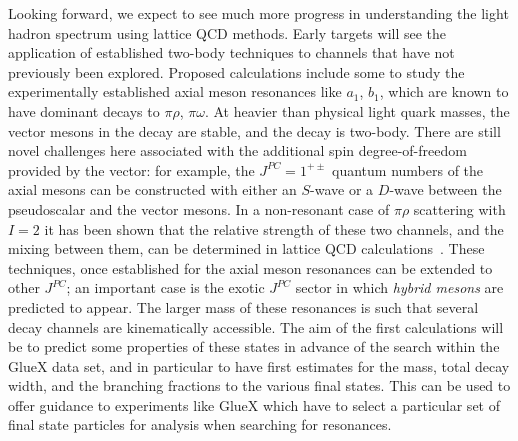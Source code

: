 Looking forward, we expect to see much more progress in understanding the light hadron spectrum using lattice QCD methods. Early targets will see the application of established two-body techniques to channels that have not previously been explored. Proposed calculations include some to study the experimentally established axial meson resonances like $a_1$, $b_1$, which are known to have dominant decays to $\pi \rho$, $\pi \omega$. At heavier than physical light quark masses, the vector mesons in the decay are stable, and the decay is two-body. There are still novel challenges here associated with the additional spin degree-of-freedom provided by the vector: for example, the $J^{PC}=1^{+\pm}$ quantum numbers of the axial mesons can be constructed with either an $S$-wave or a $D$-wave between the pseudoscalar and the vector mesons. In a non-resonant case of $\pi \rho$ scattering with $I=2$ it has been shown that the relative strength of these two channels, and the mixing between them, can be determined in lattice QCD calculations~\cite{Woss:2018irj}. These techniques, once established for the axial meson resonances can be extended to other $J^{PC}$; an important case is the exotic $J^{PC}$ sector in which \emph{hybrid mesons} are predicted to appear. The larger mass of these resonances is such that several decay channels are kinematically accessible. The aim of the first calculations will be to predict some properties of these states in advance of the search within the GlueX data set, and in particular to have first estimates for the mass, total decay width, and the branching fractions to the various final states. This can be used to offer guidance to experiments like GlueX which have to select a particular set of final state particles for analysis when searching for resonances.

